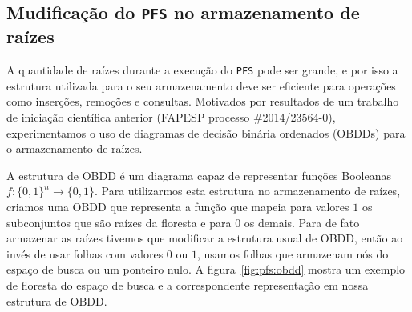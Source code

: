 \documentclass[12pt]{article}
\newcommand{\algname}[1]{\texttt{#1}}
\begin{document}
\subsection{Mudificação do \algname{PFS} no armazenamento de raízes}
\label{sec:pfs_root_data}
A quantidade de raízes durante a execução do \algname{PFS} pode ser 
grande, e por isso a estrutura utilizada para o seu armazenamento deve
ser eficiente para operações como inserções, remoções e consultas. 
Motivados por resultados de um trabalho de iniciação científica 
anterior (FAPESP processo \#2014/23564-0), experimentamos o uso de
diagramas de decisão binária ordenados (OBDDs) para o armazenamento
de raízes.

A estrutura de OBDD é um diagrama capaz de representar funções Booleanas
$f: \{0, 1\}^n \to \{0, 1\}$. Para utilizarmos esta estrutura no 
armazenamento de raízes, criamos uma OBDD que representa a função que 
mapeia para valores $1$ os subconjuntos que são raízes da floresta
e para $0$ os demais. Para de fato armazenar as raízes tivemos que 
modificar a estrutura usual de OBDD, então ao invés de usar folhas com 
valores $0$ ou $1$, usamos folhas que armazenam nós do espaço de busca
ou um ponteiro nulo. A figura~\ref{fig:pfs:obdd} mostra um exemplo de 
floresta do espaço de busca e a correspondente representação em nossa 
estrutura de OBDD. 
\end{document}
